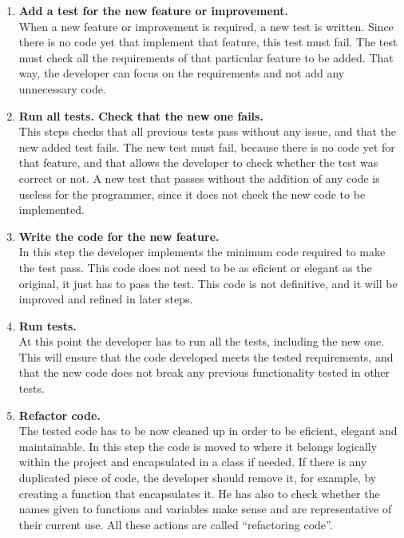 \begin{enumerate}
	\item {\bfseries Add a test for the new feature or improvement.}\\
	When a new feature or improvement is required, a new test is written. Since there is no code yet that implement that feature, this test must fail. The test must check all the requirements of that particular feature to be added. That way, the developer can focus on the requirements and not add any unnecessary code.\\
	
	\item {\bfseries Run all tests. Check that the new one fails. }\\
	This steps checks that all previous tests pass without any issue, and that the new added test fails. The new test must fail, because there is no code yet for that feature, and that allows the developer to check whether the test was correct or not. A new test that passes without the addition of any code is useless for the programmer, since it does not check the new code to be implemented.\\
	
	\item {\bfseries Write the code for the new feature.}\\
	In this step the developer implements the minimum code required to make the test pass. This code does not need to be as eficient or elegant as the original, it just has to pass the test. This code is not definitive, and it will be improved and refined in later steps.\\
	
	\item {\bfseries Run tests.}\\
	At this point the developer has to run all the tests, including the new one. This will ensure that the code developed meets the tested requirements, and that the new code does not break any previous functionality tested in other tests.\\
	
	\item {\bfseries Refactor code.}\\
	The tested code has to be now cleaned up in order to be eficient, elegant and maintainable. In this step the code is moved to where it belongs logically within the project and encapsulated in a class if needed. If there is any duplicated piece of code, the developer should remove it, for example, by creating a function that encapsulates it. He has also to check whether the names given to functions and variables make sense and are representative of their current use. All these actions are called ``refactoring code''.\\
	

\end{enumerate}
